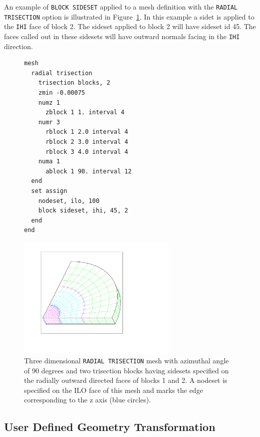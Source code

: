 An example of \texttt{BLOCK SIDESET} applied to a mesh definition with the
\texttt{RADIAL TRISECTION} option is illustrated in
Figure~\ref{fig:block_ss}. In this example a sidet is applied to the
\texttt{IHI} face of block 2. The sideset applied to block 2 will
have sideset id 45. The faces called out in these sidesets will have
outward normals facing in the \texttt{IHI} direction.

\begin{figure}[htbp]
\centering
  \begin{minipage}[c]{0.4\linewidth}
    \centering
{\ttfamily \begin{verbatim}
mesh
  radial trisection
    trisection blocks, 2
    zmin -0.00075
    numz 1
      zblock 1 1. interval 4
    numr 3 
      rblock 1 2.0 interval 4
      rblock 2 3.0 interval 4
      rblock 3 4.0 interval 4
    numa 1
      ablock 1 90. interval 12
  end
  set assign
    nodeset, ilo, 100
    block sideset, ihi, 45, 2
  end
end
\end{verbatim}}
  \end{minipage}%
  \hfil
  \begin{minipage}[c]{0.6\linewidth}
    \centering
      \includegraphics[width=3.0in]{block_ss}
  \end{minipage}
  \caption [A \texttt{RADIAL TRISECTION} mesh with sidesets.] {Three dimensional \texttt{RADIAL TRISECTION} mesh with azimuthal
    angle of 90 degrees and two trisection blocks having sidesets
    specified on the radially outward directed faces of blocks 1 and 2. A nodeset is specified on the \textsc{ILO} face of this mesh and marks the edge corresponding to the z axis (blue circles).}
  \label{fig:block_ss}
\end{figure}

\clearpage
\subsection{User Defined Geometry Transformation}
\label{sec:inline-geometry-transform}


